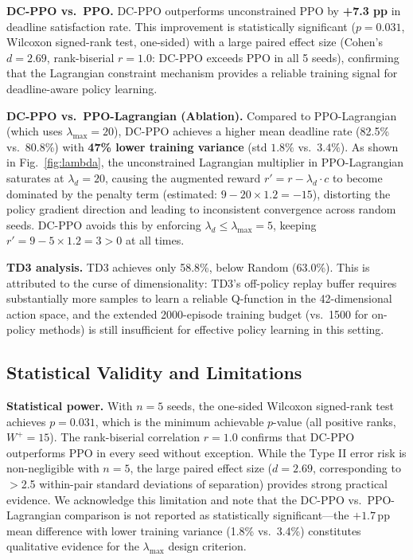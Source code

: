 \documentclass[journal]{IEEEtran}
\newcommand{\ld}{\lambda_d}
\begin{document}
\textbf{DC-PPO vs.\ PPO.}
DC-PPO outperforms unconstrained PPO by \textbf{+7.3 pp}
in deadline satisfaction rate.
This improvement is statistically significant
($p{=}0.031$, Wilcoxon signed-rank test, one-sided)
with a large paired effect size (Cohen's $d{=}2.69$,
rank-biserial $r{=}1.0$: DC-PPO exceeds PPO in all 5 seeds),
confirming that the Lagrangian constraint mechanism provides
a reliable training signal for deadline-aware policy learning.

\textbf{DC-PPO vs.\ PPO-Lagrangian (Ablation).}
Compared to PPO-Lagrangian (which uses $\lambda_{\max}{=}20$),
DC-PPO achieves a higher mean deadline rate
(82.5\% vs.\ 80.8\%) with \textbf{47\% lower training variance}
(std $1.8\%$ vs.\ $3.4\%$).
As shown in Fig.~\ref{fig:lambda}, the unconstrained Lagrangian
multiplier in PPO-Lagrangian saturates at $\ld{=}20$, causing
the augmented reward $r' = r - \ld \cdot c$ to become
dominated by the penalty term (estimated: $9 - 20 \times 1.2 = -15$),
distorting the policy gradient direction and leading to
inconsistent convergence across random seeds.
DC-PPO avoids this by enforcing $\ld \le \lambda_{\max}{=}5$,
keeping $r' = 9 - 5 \times 1.2 = 3 > 0$ at all times.

\textbf{TD3 analysis.}
TD3 achieves only 58.8\%, below Random (63.0\%).
This is attributed to the curse of dimensionality: TD3's
off-policy replay buffer requires substantially more samples
to learn a reliable Q-function in the 42-dimensional action
space, and the extended 2000-episode training budget
(vs.\ 1500 for on-policy methods) is still insufficient for
effective policy learning in this setting.

\subsection{Statistical Validity and Limitations}
\label{sec:stats_note}

\textbf{Statistical power.}
With $n{=}5$ seeds, the one-sided Wilcoxon signed-rank test
achieves $p{=}0.031$, which is the minimum achievable $p$-value
(all positive ranks, $W^+{=}15$).
The rank-biserial correlation $r{=}1.0$ confirms that
DC-PPO outperforms PPO in every seed without exception.
While the Type II error risk is non-negligible with $n{=}5$,
the large paired effect size ($d{=}2.69$, corresponding to
$>$2.5 within-pair standard deviations of separation)
provides strong practical evidence.
We acknowledge this limitation and note that the
DC-PPO vs.\ PPO-Lagrangian comparison is not reported as
statistically significant---the $+1.7$\,pp mean difference
with lower training variance (1.8\% vs.\ 3.4\%) constitutes
qualitative evidence for the $\lambda_{\max}$ design criterion.
\end{document}
